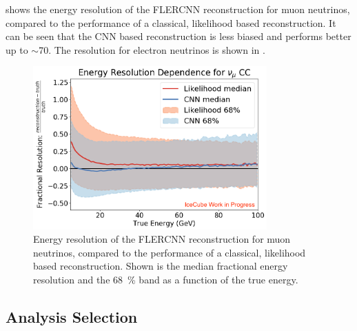  shows the energy resolution of the FLERCNN reconstruction for muon neutrinos, compared to the performance of a classical, likelihood based reconstruction. It can be seen that the CNN based reconstruction is less biased and performs better up to $\sim$\SI{70}{\gev}. The resolution for electron neutrinos is shown in .

\begin{figure}[h]
    \includegraphics[width=0.8\textwidth]{figures/simulation_and_processing/flercnn/EnergyCNNResolution_NuMuCC_CompareLikelihoodReco.png}
	\caption[FLERCNN energy resolution for muon neutrinos]{Energy resolution of the FLERCNN reconstruction for muon neutrinos, compared to the performance of a classical, likelihood based reconstruction. Shown is the median fractional energy resolution and the \SI{68}{\percent} band as a function of the true energy.}
\end{figure}


\subsection{Analysis Selection} 

